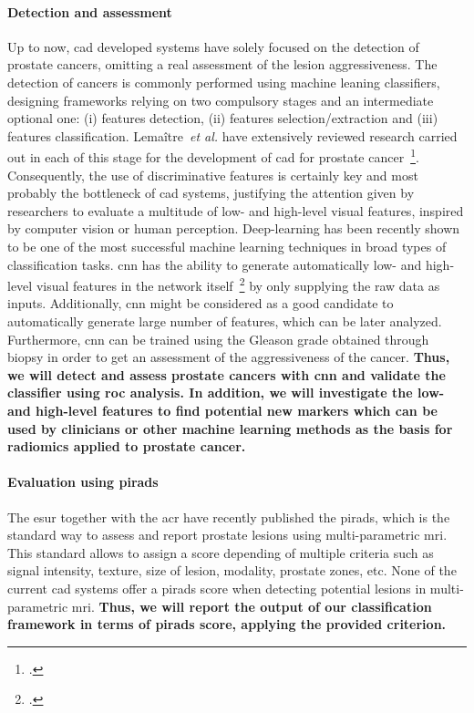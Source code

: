 \paragraph{Detection and assessment}

Up to now, \ac{cad} developed systems have solely focused on the detection of prostate cancers, omitting a real assessment of the lesion aggressiveness.
The detection of cancers is commonly performed using machine leaning classifiers, designing frameworks relying on two compulsory stages and an intermediate optional one: (i) features detection, (ii) features selection/extraction and (iii) features classification.
Lema\^itre~\emph{et al.} have extensively reviewed research carried out in each of this stage for the development of \ac{cad} for prostate cancer~\footcite{Lemaitre2015}.
Consequently, the use of discriminative features is certainly key and most probably the bottleneck of \ac{cad} systems, justifying the attention given by researchers to evaluate a multitude of low- and high-level visual features, inspired by computer vision or human perception.
Deep-learning has been recently shown to be one of the most successful machine learning techniques in broad types of classification tasks.
\ac{cnn} has the ability to generate automatically low- and high-level visual features in the network itself~\footcite{Zeiler2013} by only supplying the raw data as inputs.
Additionally, \ac{cnn} might be considered as a good candidate to automatically generate large number of features, which can be later analyzed.
Furthermore, \ac{cnn} can be trained using the Gleason grade obtained through biopsy in order to get an assessment of the aggressiveness of the cancer.
\textbf{Thus, we will detect and assess prostate cancers with \ac{cnn} and validate the classifier using \ac{roc} analysis.
  In addition, we will investigate the low- and high-level features to find potential new markers which can be used by clinicians or other machine learning methods as the basis for radiomics applied to prostate cancer.}

\paragraph{Evaluation using \acs*{pirads}}

The \ac{esur} together with the \ac{acr} have recently published the \ac{pirads}, which is the standard way to assess and report prostate lesions using multi-parametric \ac{mri}.
This standard allows to assign a score depending of multiple criteria such as signal intensity, texture, size of lesion, modality, prostate zones, etc.
None of the current \ac{cad} systems offer a \ac{pirads} score when detecting potential lesions in multi-parametric \ac{mri}.
\textbf{Thus, we will report the output of our classification framework in terms of \ac{pirads} score, applying the provided criterion.}

